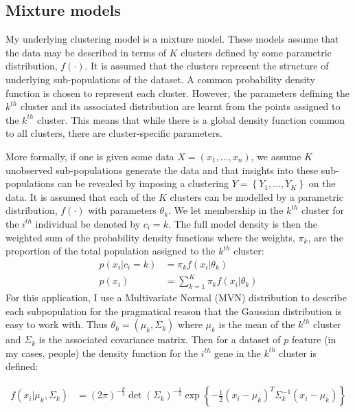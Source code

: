 \documentclass[14pt]{extarticle} %
\begin{document}
	\subsection{Mixture models} \label{sec:theory:sub_sec:mixture_models}
	My underlying clustering model is a mixture model. These models assume that the data may be described in terms of $K$ clusters defined by some parametric distribution, $f(\cdot)$. It is assumed that the clusters represent the structure of underlying sub-populations of the dataset. A common probability density function is chosen to represent each cluster. However, the parameters defining the $k^{th}$ cluster and its associated distribution are learnt from the points assigned to the $k^{th}$ cluster. This means that while there is a global density function common to all clusters, there are cluster-specific parameters.
	
	More formally, if one is given some data $X = (x_1, \ldots, x_n)$, we assume $K$ unobserved sub-populations generate the data and that insights into these sub-populations can be revealed by imposing a clustering $Y = \left\{Y_1,\ldots,Y_K\right\}$ on the data. It is assumed that each of the $K$ clusters can be modelled by a parametric distribution, $f(\cdot)$ with parameters $\theta_k$. We let membership in the $k^{th}$ cluster for the $i^{th}$ individual be denoted by $c_i = k$. The full model density is then the weighted sum of the probability density functions where the weights, $\pi_k$, are the proportion of the total population assigned to the $k^{th}$ cluster:
	\begin{align}
	p(x_i|c_i = k) &= \pi_k f(x_i | \theta_k) \\
	p(x_i) &= \sum_{k=1}^K \pi_k f(x_i | \theta_k) \label{eqn:finite_dirichlet__mixture_model}
	\end{align}
	For this application, I use a Multivariate Normal (MVN) distribution to describe each subpopulation for the pragmatical reason that the Gaussian distribution is easy to work with. Thus $\theta_k = (\mu_k, \Sigma_k)$ where $\mu_k$ is the mean of the $k^{th}$ cluster and $\Sigma_k$ is the associated covariance matrix. Then for a dataset of $p$ feature (in my cases, people) the density function for the $i^{th}$ gene in the $k^{th}$ cluster is defined:
	
	\begin{align}
	f(x_i| \mu_k, \Sigma_k) &= (2 \pi)^{-\frac{p}{2}}\det(\Sigma_k)^{-\frac{1}{2}} \exp\left\{-\frac{1}{2} (x_i - \mu_k)^T \Sigma_k^{-1} (x_i - \mu_k)\right\}
	\end{align}
	
\end{document}
